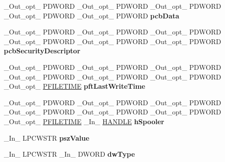 \begin{DoxyCompactItemize}
\item 
\mbox{\label{struct___m_o_n_i_t_o_r_r_e_g_ae144826f2c2a6b820425c8941fae9b97}} 
\+\_\+\+Out\+\_\+opt\+\_\+ P\+D\+W\+O\+RD \+\_\+\+Out\+\_\+opt\+\_\+ P\+D\+W\+O\+RD \+\_\+\+Out\+\_\+opt\+\_\+ P\+D\+W\+O\+RD \+\_\+\+Out\+\_\+opt\+\_\+ P\+D\+W\+O\+RD \+\_\+\+Out\+\_\+opt\+\_\+ P\+D\+W\+O\+RD {\bfseries pcb\+Data}
\item 
\mbox{\label{struct___m_o_n_i_t_o_r_r_e_g_a48dc46e11e88e35437ffbb853dec7c3d}} 
\+\_\+\+Out\+\_\+opt\+\_\+ P\+D\+W\+O\+RD \+\_\+\+Out\+\_\+opt\+\_\+ P\+D\+W\+O\+RD \+\_\+\+Out\+\_\+opt\+\_\+ P\+D\+W\+O\+RD \+\_\+\+Out\+\_\+opt\+\_\+ P\+D\+W\+O\+RD \+\_\+\+Out\+\_\+opt\+\_\+ P\+D\+W\+O\+RD \+\_\+\+Out\+\_\+opt\+\_\+ P\+D\+W\+O\+RD {\bfseries pcb\+Security\+Descriptor}
\item 
\mbox{\label{struct___m_o_n_i_t_o_r_r_e_g_a969b40b746baf960a4929ef4ca87f4be}} 
\+\_\+\+Out\+\_\+opt\+\_\+ P\+D\+W\+O\+RD \+\_\+\+Out\+\_\+opt\+\_\+ P\+D\+W\+O\+RD \+\_\+\+Out\+\_\+opt\+\_\+ P\+D\+W\+O\+RD \+\_\+\+Out\+\_\+opt\+\_\+ P\+D\+W\+O\+RD \+\_\+\+Out\+\_\+opt\+\_\+ P\+D\+W\+O\+RD \+\_\+\+Out\+\_\+opt\+\_\+ P\+D\+W\+O\+RD \+\_\+\+Out\+\_\+opt\+\_\+ \hyperlink{struct___f_i_l_e_t_i_m_e}{P\+F\+I\+L\+E\+T\+I\+ME} {\bfseries pft\+Last\+Write\+Time}
\item 
\mbox{\label{struct___m_o_n_i_t_o_r_r_e_g_a647cc8f5546d5477e77fc2ec99a4a168}} 
\+\_\+\+Out\+\_\+opt\+\_\+ P\+D\+W\+O\+RD \+\_\+\+Out\+\_\+opt\+\_\+ P\+D\+W\+O\+RD \+\_\+\+Out\+\_\+opt\+\_\+ P\+D\+W\+O\+RD \+\_\+\+Out\+\_\+opt\+\_\+ P\+D\+W\+O\+RD \+\_\+\+Out\+\_\+opt\+\_\+ P\+D\+W\+O\+RD \+\_\+\+Out\+\_\+opt\+\_\+ P\+D\+W\+O\+RD \+\_\+\+Out\+\_\+opt\+\_\+ \hyperlink{struct___f_i_l_e_t_i_m_e}{P\+F\+I\+L\+E\+T\+I\+ME} \+\_\+\+In\+\_\+ \hyperlink{interfacevoid}{H\+A\+N\+D\+LE} {\bfseries h\+Spooler}
\item 
\mbox{\label{struct___m_o_n_i_t_o_r_r_e_g_aeff8301683e8b565181c103ae598bfe6}} 
\+\_\+\+In\+\_\+ L\+P\+C\+W\+S\+TR {\bfseries psz\+Value}
\item 
\mbox{\label{struct___m_o_n_i_t_o_r_r_e_g_a737ca6eb0403277aadde00e58af0a508}} 
\+\_\+\+In\+\_\+ L\+P\+C\+W\+S\+TR \+\_\+\+In\+\_\+ D\+W\+O\+RD {\bfseries dw\+Type}

\end{DoxyCompactItemize}
